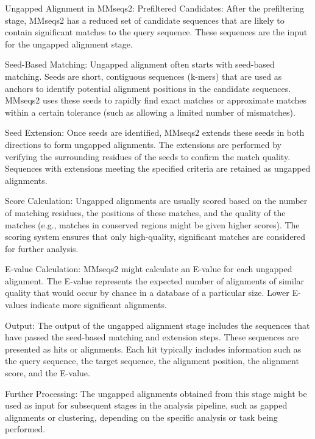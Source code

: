 Ungapped Alignment in MMseqs2:
Prefiltered Candidates:
After the prefiltering stage, MMseqs2 has a reduced set of candidate sequences that are likely to contain significant matches to the query sequence. These sequences are the input for the ungapped alignment stage.

Seed-Based Matching:
Ungapped alignment often starts with seed-based matching. Seeds are short, contiguous sequences (k-mers) that are used as anchors to identify potential alignment positions in the candidate sequences. MMseqs2 uses these seeds to rapidly find exact matches or approximate matches within a certain tolerance (such as allowing a limited number of mismatches).

Seed Extension:
Once seeds are identified, MMseqs2 extends these seeds in both directions to form ungapped alignments. The extensions are performed by verifying the surrounding residues of the seeds to confirm the match quality. Sequences with extensions meeting the specified criteria are retained as ungapped alignments.

Score Calculation:
Ungapped alignments are usually scored based on the number of matching residues, the positions of these matches, and the quality of the matches (e.g., matches in conserved regions might be given higher scores). The scoring system ensures that only high-quality, significant matches are considered for further analysis.

E-value Calculation:
MMseqs2 might calculate an E-value for each ungapped alignment. The E-value represents the expected number of alignments of similar quality that would occur by chance in a database of a particular size. Lower E-values indicate more significant alignments.

Output:
The output of the ungapped alignment stage includes the sequences that have passed the seed-based matching and extension steps. These sequences are presented as hits or alignments. Each hit typically includes information such as the query sequence, the target sequence, the alignment position, the alignment score, and the E-value.

Further Processing:
The ungapped alignments obtained from this stage might be used as input for subsequent stages in the analysis pipeline, such as gapped alignments or clustering, depending on the specific analysis or task being performed.

